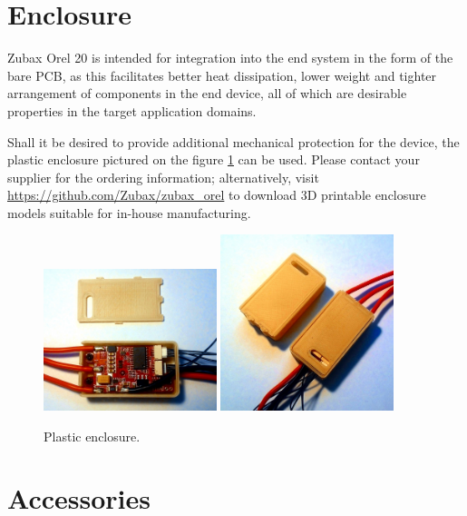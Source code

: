 \documentclass{zubaxdoc}
\begin{document}
\section{Enclosure}\label{sec:enclosure}

Zubax Orel 20 is intended for integration into the end system in the form of the bare PCB,
as this facilitates better heat dissipation, lower weight and tighter arrangement of components
in the end device, all of which are desirable properties in the target application domains.

Shall it be desired to provide additional mechanical protection for the device,
the plastic enclosure pictured on the figure \ref{enclosure} can be used.
Please contact your supplier for the ordering information;
alternatively, visit \url{https://github.com/Zubax/zubax_orel} to download
3D printable enclosure models suitable for in-house manufacturing.

\begin{figure}[hb]
	\centering
	\includegraphics[width=0.45\textwidth]{enclosure-open}
	\includegraphics[width=0.45\textwidth]{enclosure-closed}
	\caption{Plastic enclosure.\label{enclosure}}
\end{figure}

\section{Accessories}
\end{document}
